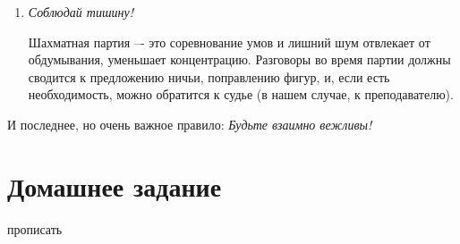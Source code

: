 \begin{enumerate}
\item \emph{Соблюдай тишину!}

Шахматная партия –- это соревнование умов и лишний шум отвлекает от обдумывания, уменьшает концентрацию. Разговоры во время партии должны сводится к предложению ничьи, поправлению фигур, и, если есть необходимость, можно обратится к судье (в нашем случае, к преподавателю).

\end{enumerate}

И последнее, но очень важное правило: \emph{Будьте взаимно вежливы!}

\section{Домашнее задание}

прописать